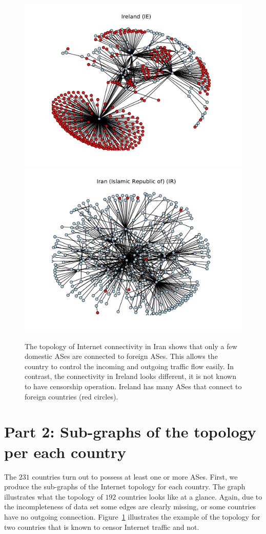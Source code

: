 \documentclass{article}
\begin{document}
\begin{figure}[h]

\includegraphics[width=0.8\linewidth]{IE.pdf}
\includegraphics[width=0.8\linewidth]{IR.pdf}
\caption{The topology of Internet connectivity in Iran shows that only a few 
domestic ASes are connected to foreign ASes. This allows the country to control
the incoming and outgoing traffic flow easily. In contrast, the connectivity in Ireland
looks different, it is not known to have censorship operation. Ireland has many ASes
that connect to foreign countries (red circles).}
\label{fig:topo_iran}
\end{figure}

\section*{Part 2: Sub-graphs of the topology per each country}

\bigskip

\noindent 
The $231$ countries turn out to possess at least one or more ASes. First, we
produce the sub-graphs of the Internet topology for each country.
The graph illustrates what the topology
of $192$ countries looks like at a glance. Again, due to the incompleteness of
data set some edges are clearly missing, or some countries have no outgoing
connection. Figure~\ref{fig:topo_iran} illustrates the example of the topology 
for two countries that is known to censor Internet traffic and not. 
\end{document}
